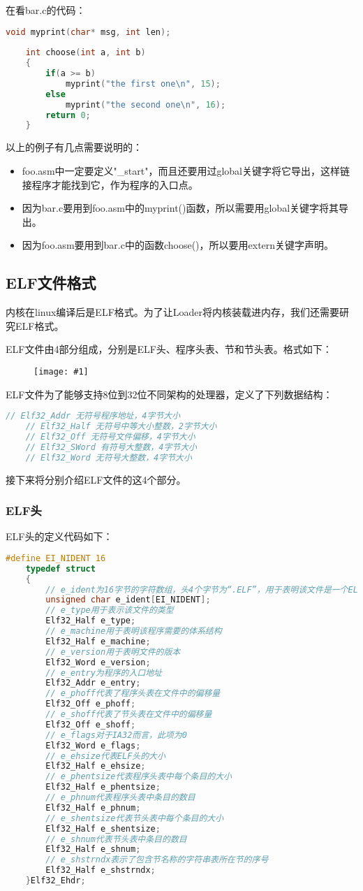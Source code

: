 \documentclass[a4paper,left=2.5cm,right=2.5cm,11pt]{article}
\newcommand{\fic}[1]{\begin{figure}[H]
		\center
		\texttt{[image: \#1]}
	\end{figure}}
\begin{document}
	在看bar.c的代码：
	\begin{lstlisting}[language = C]
	void myprint(char* msg, int len);
	
	int choose(int a, int b)
	{
		if(a >= b)
			myprint("the first one\n", 15);
		else
			myprint("the second one\n", 16);
		return 0;
	}
	\end{lstlisting}

	以上的例子有几点需要说明的：
	\begin{itemize}
		\item foo.asm中一定要定义"\_start"，而且还要用过global关键字将它导出，这样链接程序才能找到它，作为程序的入口点。
		\item 因为bar.c要用到foo.asm中的myprint()函数，所以需要用global关键字将其导出。
		\item 因为foo.asm要用到bar.c中的函数choose()，所以要用extern关键字声明。
	\end{itemize}

\subsection{ELF文件格式}
	内核在linux编译后是ELF格式。为了让Loader将内核装载进内存，我们还需要研究ELF格式。\par
	ELF文件由4部分组成，分别是ELF头、程序头表、节和节头表。格式如下：
	\fic{6.png}

	ELF文件为了能够支持8位到32位不同架构的处理器，定义了下列数据结构：
	\begin{lstlisting}[language = C]
	// Elf32_Addr 无符号程序地址，4字节大小
	// Elf32_Half 无符号中等大小整数，2字节大小
	// Elf32_Off 无符号文件偏移，4字节大小
	// Elf32_SWord 有符号大整数，4字节大小
	// Elf32_Word 无符号大整数，4字节大小
	\end{lstlisting}

	接下来将分别介绍ELF文件的这4个部分。

\subsubsection{ELF头}
	ELF头的定义代码如下：
	\begin{lstlisting}[language = C]
	#define EI_NIDENT 16
	typedef struct
	{
		// e_ident为16字节的字符数组，头4个字节为“.ELF”，用于表明该文件是一个ELF文件。接下来的12个字节是一些与机器无关的信息。
		unsigned char e_ident[EI_NIDENT];
		// e_type用于表示该文件的类型
		Elf32_Half e_type;
		// e_machine用于表明该程序需要的体系结构
		Elf32_Half e_machine;
		// e_version用于表明文件的版本
		Elf32_Word e_version;
		// e_entry为程序的入口地址
		Elf32_Addr e_entry;
		// e_phoff代表了程序头表在文件中的偏移量
		Elf32_Off e_phoff;
		// e_shoff代表了节头表在文件中的偏移量
		Elf32_Off e_shoff;
		// e_flags对于IA32而言，此项为0
		Elf32_Word e_flags;
		// e_ehsize代表ELF头的大小
		Elf32_Half e_ehsize;
		// e_phentsize代表程序头表中每个条目的大小
		Elf32_Half e_phentsize;
		// e_phnum代表程序头表中条目的数目
		Elf32_Half e_phnum;
		// e_shentsize代表节头表中每个条目的大小
		Elf32_Half e_shentsize;
		// e_shnum代表节头表中条目的数目
		Elf32_Half e_shnum;
		// e_shstrndx表示了包含节名称的字符串表所在节的序号
		Elf32_Half e_shstrndx;
	}Elf32_Ehdr;
	\end{lstlisting}
\end{document}
